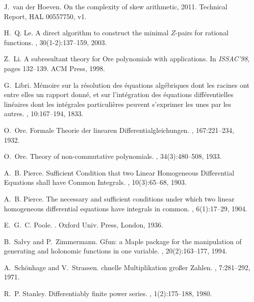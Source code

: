 \documentclass{sig-alt-full}
\def\hoeven#1{{#1}}
\begin{document}
\begin{thebibliography}{10}
J.~\hoeven{van der} Hoeven.
\newblock On the complexity of skew arithmetic, 2011.
\newblock Technical Report, HAL 00557750, v1.

H.~Q. Le.
\newblock A direct algorithm to construct the minimal {$Z$}-pairs for rational
  functions.
, 30(1-2):137--159, 2003.

Z.~Li.
\newblock A subresultant theory for {O}re polynomials with applications.
\newblock In {\em ISSAC'98}, pages 132--139. ACM Press, 1998.

G.~Libri.
\newblock M\'emoire sur la r\'esolution des \'equations alg\'ebriques dont les
  racines ont entre elles un rapport donn\'e, et sur l'int\'egration des
  \'equations diff\'erentielles lin\'eaires dont les int\'egrales
  particuli\`eres peuvent s'exprimer les unes par les autres.
, 10:167--194, 1833.

O.~Ore.
\newblock Formale {T}heorie der linearen {D}ifferentialgleichungen.
, 167:221--234, 1932.

O.~Ore.
\newblock Theory of non-commutative polynomials.
, 34(3):480--508, 1933.

A.~B. Pierce.
\newblock Sufficient {C}ondition that two {L}inear {H}omogeneous {D}ifferential
  {E}quations shall have {C}ommon {I}ntegrals.
, 10(3):65--68, 1903.

A.~B. Pierce.
\newblock The necessary and sufficient conditions under which two linear
  homogeneous differential equations have integrals in common.
, 6(1):17--29, 1904.

E.~G.~C. Poole.
.
\newblock Oxford Univ. Press, London, 1936.

B.~Salvy and P.~Zimmermann.
\newblock Gfun: a {M}aple package for the manipulation of generating and
  holonomic functions in one variable.
, 20(2):163--177, 1994.

A.~Sch{\"o}nhage and V.~Strassen.
chnelle {M}ultiplikation gro\ss er {Z}ahlen.
, 7:281--292, 1971.

R.~P. Stanley.
\newblock Differentiably finite power series.
, 1(2):175--188, 1980.


\end{thebibliography}
\end{document}
